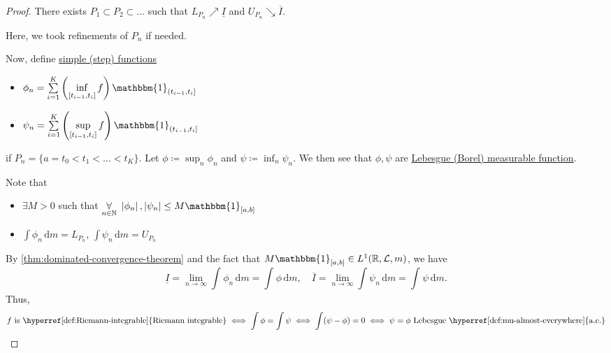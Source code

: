\begin{proof}
	There exists \(P_1\subset P_2\subset \ldots  \) such that \(L_{P_{n}}\nearrow \underline{I} \) and \(U_{P_{n}}\searrow \overline{I} \).
	\begin{note}
		Here, we took refinements of \(P_{n}\) if needed.
	\end{note}
	Now, define \hyperref[def:simple-function]{simple (step) functions}
	\begin{itemize}
		\item \(\phi _{n} = \sum\limits_{i=1}^{K} \left(\inf\limits_{[t_{i-1}, t_{i}]} f \right) \mathbbm{1}_{(t_{i-1}, t_{i}]} \)
		\item \(\psi _{n} = \sum\limits_{i=1}^{K} \left(\sup\limits_{[t_{i-1}, t_{i}]} f \right) \mathbbm{1}_{(t_{i-1}, t_{i}]} \)
	\end{itemize}
	if \(P_{n} = \{a = t_0 < t_1 < \ldots < t_{K} \}\). Let \(\phi \coloneqq \sup_n \phi _{n}\) and \(\psi \coloneqq \inf _n \psi _{n}\).
	We then see that \(\phi , \psi \) are \hyperref[def:measurable-function]{Lebesgue (Borel) measurable function}.
	\begin{note}
		Note that
		\begin{itemize}
			\item \(\exists M> 0\) such that \(\underset{n\in\mathbb{\MakeUppercase{n}} }{\forall }\ \left\vert \phi _{n} \right\vert, \left\vert \psi _{n} \right\vert \leq M\mathbbm{1}_{[a, b]} \)
			\item \(\int \phi _{n}\,\mathrm{d}m = L_{P_{n}}\), \(\int \psi _{n}\,\mathrm{d}m = U_{P_{n}}\)
		\end{itemize}
	\end{note}
	By \autoref{thm:dominated-convergence-theorem} and the fact that \(M\mathbbm{1}_{[a, b]} \in L^1(\mathbb{\MakeUppercase{r}} , \mathcal{\MakeUppercase{l}} , m) \),
	we have
	\[
		\underline{I} = \lim\limits_{n \to \infty} \int_{}^{} \phi _{n} \,\mathrm{d}m = \int_{}^{} \phi  \,\mathrm{d}m,\quad
		\overline{I} = \lim\limits_{n \to \infty} \int \psi _n\,\mathrm{d} m = \int_{}^{} \psi  \,\mathrm{d}m.
	\]
	Thus,
	\[
		f \text{ is \hyperref[def:Riemann-integrable]{Riemann integrable}}
		\iff \int \phi = \int \psi
		\iff \int (\psi - \phi ) = 0
		\iff \psi = \phi \text{ Lebesgue \hyperref[def:mu-almost-everywhere]{a.e.}}
	\]
\end{proof}

